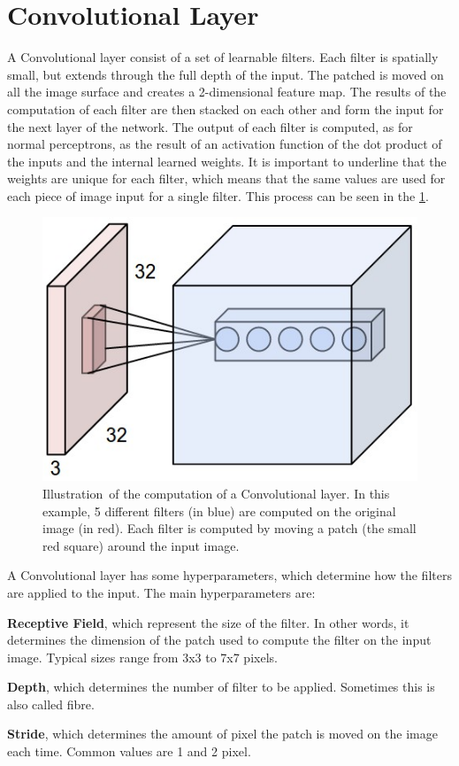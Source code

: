 \section{Convolutional Layer}
\label{sec:conv_layer}

A Convolutional layer consist of a set of learnable filters.
Each filter is spatially small, but extends through the full depth of the input.
The patched is moved on all the image surface and creates a 2-dimensional feature map.
The results of the computation of each filter are then stacked on each other and form the input for the next layer of the network.
The output of each filter is computed, as for normal perceptrons, as the result of an activation function of the dot product of the inputs and the internal learned weights.
It is important to underline that the weights are unique for each filter, which means that the same values are used for each piece of image input for a single filter.
This process can be seen in the \cref{fig:convolution}.

\begin{figure}[ht]
	\centering
	\includegraphics[scale=0.35]{figures/convolution}
	\caption{Illustration\protect\footnotemark ~of the computation of a Convolutional layer. In this example, 5 different filters (in blue) are computed on the original image (in red). Each filter is computed by moving a patch (the small red square) around the input image.}
	\label{fig:convolution}
\end{figure}

A Convolutional layer has some hyperparameters, which determine how the filters are applied to the input.
The main hyperparameters are:
\begin{itemize}
    \item{\textbf{Receptive Field}, which represent the size of the filter. In other words, it determines the dimension of the patch used to compute the filter on the input image. Typical sizes range from 3x3 to 7x7 pixels.
    \item{\textbf{Depth}, which determines the number of filter to be applied. Sometimes this is also called fibre.}
    \item{\textbf{Stride}, which determines the amount of pixel the patch is moved on the image each time. Common values are 1 and 2 pixel.}
}
\end{itemize}
